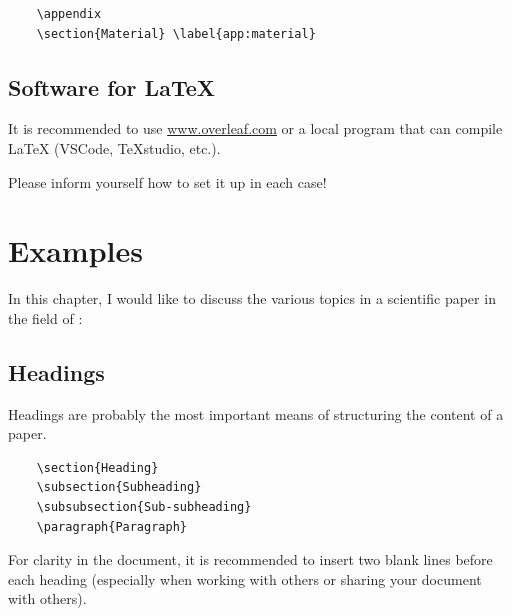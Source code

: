 \begin{verbatim}
    \appendix
    \section{Material} \label{app:material}
\end{verbatim}


\subsection{Software for \LaTeX}

It is recommended to use \href{https://www.overleaf.com/}{www.overleaf.com} or a local program that can compile \LaTeX{} (VSCode, TeXstudio, etc.).

\textcolor{red1}{Please inform yourself how to set it up in each case!}

\pagebreak
\section{Examples} \label{sec:examples}

In this chapter, I would like to discuss the various topics in a scientific paper in the field of :


\subsection{Headings}

Headings are probably the most important means of structuring the content of a paper.

\begin{verbatim}
    \section{Heading}
    \subsection{Subheading}
    \subsubsection{Sub-subheading}
    \paragraph{Paragraph}
\end{verbatim}

For clarity in the document, it is recommended to insert two blank lines before each heading (especially when working with others or sharing your document with others).

